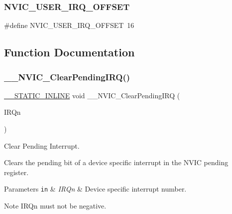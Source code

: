 \subsubsection{\texorpdfstring{N\+V\+I\+C\+\_\+\+U\+S\+E\+R\+\_\+\+I\+R\+Q\+\_\+\+O\+F\+F\+S\+ET}{NVIC\_USER\_IRQ\_OFFSET}\hspace{0.1cm}{\footnotesize\ttfamily [3/3]}}
{\footnotesize\ttfamily \#define N\+V\+I\+C\+\_\+\+U\+S\+E\+R\+\_\+\+I\+R\+Q\+\_\+\+O\+F\+F\+S\+ET~16}



\subsection{Function Documentation}
\mbox{\label{group___c_m_s_i_s___core___n_v_i_c_functions_ga562a86dbdf14827d0fee8fdafb04d191}} 
\subsubsection{\texorpdfstring{\+\_\+\+\_\+\+N\+V\+I\+C\+\_\+\+Clear\+Pending\+I\+R\+Q()}{\_\_NVIC\_ClearPendingIRQ()}}
{\footnotesize\ttfamily \mbox{\hyperlink{cmsis__iccarm_8h_aba87361bfad2ae52cfe2f40c1a1dbf9c}{\+\_\+\+\_\+\+S\+T\+A\+T\+I\+C\+\_\+\+I\+N\+L\+I\+NE}} void \+\_\+\+\_\+\+N\+V\+I\+C\+\_\+\+Clear\+Pending\+I\+RQ (\begin{DoxyParamCaption}\item[{\mbox{\hyperlink{group___interrupt__vector__numbers_gac3af4a32370fb28c4ade8bf2add80251}{I\+R\+Qn\+\_\+\+Type}}}]{I\+R\+Qn }\end{DoxyParamCaption})}



Clear Pending Interrupt. 

Clears the pending bit of a device specific interrupt in the N\+V\+IC pending register. 
\begin{DoxyParams}[1]{Parameters}
\mbox{\tt in}  & {\em I\+R\+Qn} & Device specific interrupt number. \\
\hline
\end{DoxyParams}
\begin{DoxyNote}{Note}
I\+R\+Qn must not be negative. 
\end{DoxyNote}
\mbox{\label{group___c_m_s_i_s___core___n_v_i_c_functions_gae016e4c1986312044ee768806537d52f}} 
